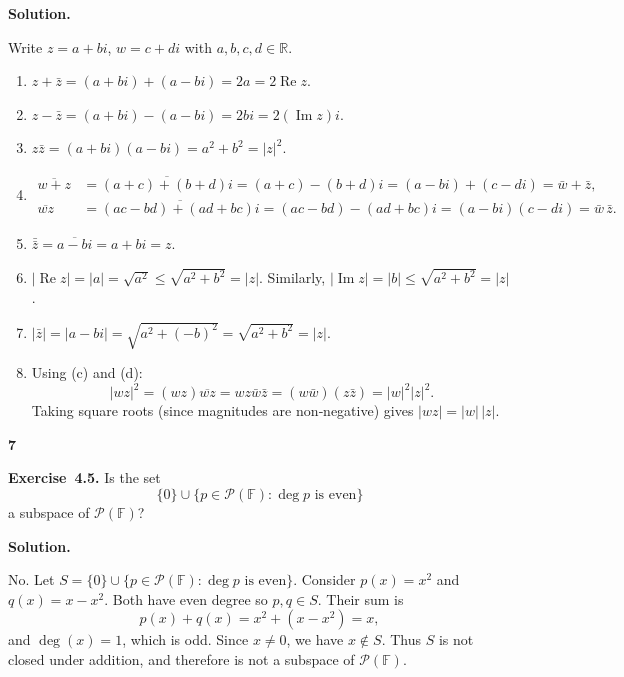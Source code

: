\documentclass[11pt]{article}
\newcommand{\ProblemDivider}[1]{%
  \vspace{1.0em}
  \noindent\textbf{#1}\par
  \vspace{0.35em}
}
\newcommand{\ProblemAnnounce}{\noindent}
\newcommand{\SolutionAnnounce}{\noindent\textbf{Solution.}\par\medskip}
\newcommand{\Exercise}[1]{\textbf{Exercise~#1.}\;}
\newcommand{\R}{\mathbb{R}}
\newcommand{\F}{\mathbb{F}}
\newcommand{\Pcal}{\mathcal{P}}
\begin{document}
\begin{solutionBox}
\SolutionAnnounce
\doublespacing

Write $z = a+bi$, $w = c+di$ with $a,b,c,d \in \R$.

\begin{enumerate}
  \item[(a)] $z + \bar{z} = (a+bi)+(a-bi) = 2a = 2\operatorname{Re} z$.
  
  \item[(b)] $z - \bar{z} = (a+bi)-(a-bi) = 2bi = 2(\operatorname{Im} z)i$.
  
  \item[(c)] $z\bar{z} = (a+bi)(a-bi) = a^2 + b^2 = |z|^2$.
  
  \item[(d)] 
  \begin{align*}
    \overline{w+z} &= \overline{(a+c)+(b+d)i} = (a+c)-(b+d)i = (a-bi)+(c-di) = \bar{w}+\bar{z},\\
    \overline{wz} &= \overline{(ac-bd)+(ad+bc)i} = (ac-bd)-(ad+bc)i = (a-bi)(c-di) = \bar{w}\,\bar{z}.
  \end{align*}
  
  \item[(e)] $\bar{\bar{z}} = \overline{a-bi} = a+bi = z$.
  
  \item[(f)] $|\operatorname{Re} z| = |a| = \sqrt{a^2} \leq \sqrt{a^2+b^2} = |z|$. Similarly, $|\operatorname{Im} z| = |b| \leq \sqrt{a^2+b^2} = |z|$.
  
  \item[(g)] $|\bar{z}| = |a-bi| = \sqrt{a^2+(-b)^2} = \sqrt{a^2+b^2} = |z|$.
  
  \item[(h)] Using (c) and (d):
  \[
  |wz|^2 = (wz)\overline{wz} = wz\bar{w}\bar{z} = (w\bar{w})(z\bar{z}) = |w|^2|z|^2.
  \]
  Taking square roots (since magnitudes are non‑negative) gives $|wz| = |w|\,|z|$.
\end{enumerate}
\end{solutionBox}

\ProblemDivider{7}

\begin{problemBox}
\ProblemAnnounce
\Exercise{4.5}
Is the set
\[
\{0\} \cup \{p \in \Pcal(\F) : \deg p \text{ is even}\}
\]
a subspace of $\Pcal(\F)$?
\end{problemBox}

\begin{solutionBox}
\SolutionAnnounce
\doublespacing

No. Let $S = \{0\} \cup \{p \in \Pcal(\F) : \deg p \text{ is even}\}$. Consider $p(x)=x^2$ and $q(x)=x-x^2$. Both have even degree so $p,q \in S$. Their sum is
\[
p(x)+q(x) = x^2 + (x-x^2) = x,
\]
and $\deg(x)=1$, which is odd. Since $x \neq 0$, we have $x \notin S$. Thus $S$ is not closed under addition, and therefore is not a subspace of $\Pcal(\F)$.
\end{solutionBox}
\end{document}
